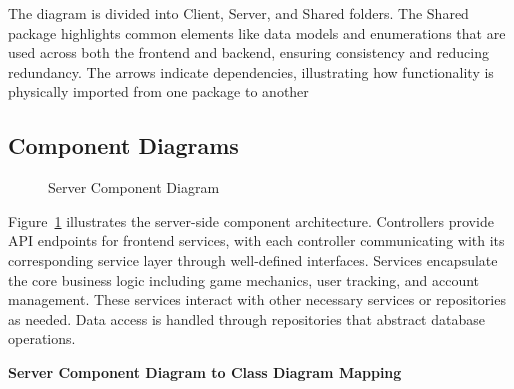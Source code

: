 \documentclass[11pt,a4paper]{article}
\newcommand{\inputdiagram}[1]{}
\newcommand{\textwidthdiagram}[2][1]{%
  \resizebox{#1\textwidth}{!}{\inputdiagram{#2}}%
}
\begin{document}
The diagram is divided into Client, Server, and Shared folders. The Shared package highlights common elements like data models and enumerations that are used across both the frontend and backend, ensuring consistency and reducing redundancy. The arrows indicate dependencies, illustrating how functionality is physically imported from one package to another



\subsection{Component Diagrams}

\begin{figure}[H]
    \centering
    \textwidthdiagram{server_component_diagram.latex}
    \caption{Server Component Diagram}
    \label{fig:server_component_diagram}
\end{figure}

Figure~\ref{fig:server_component_diagram} illustrates the server-side component architecture. Controllers provide API endpoints for frontend services, with each controller communicating with its corresponding service layer through well-defined interfaces. Services encapsulate the core business logic including game mechanics, user tracking, and account management. These services interact with other necessary services or repositories as needed. Data access is handled through repositories that abstract database operations.


\textbf{Server Component Diagram to Class Diagram Mapping}
\end{document}
